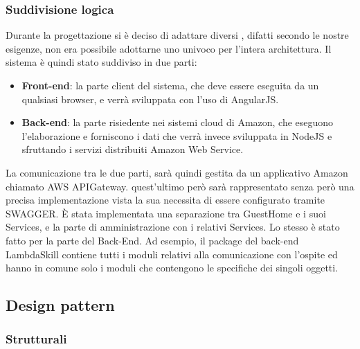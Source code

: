 \documentclass[../DefinizioneDiProdotto_v2.0.0.tex]{subfiles}
\begin{document}
\subsubsection{Suddivisione logica}
Durante la progettazione si è deciso di adattare diversi ,
difatti secondo le nostre esigenze, non era possibile adottarne uno univoco per l'intera architettura.
Il sistema è quindi stato suddiviso in due parti:
\begin{itemize}
	\item \textbf{Front-end}: la parte client del sistema, che deve essere eseguita da un qualsiasi browser, e verrà sviluppata con l'uso di AngularJS.
	\item \textbf{Back-end}: la parte risiedente nei sistemi cloud di Amazon, che eseguono l'elaborazione e forniscono i dati che verrà invece sviluppata in NodeJS e sfruttando i servizi distribuiti Amazon Web Service.
\end{itemize}
La comunicazione tra le due parti, sarà quindi gestita da un applicativo Amazon chiamato AWS APIGateway.
quest'ultimo però sarà rappresentato senza però una precisa implementazione vista la sua necessita di essere configurato tramite SWAGGER.
È stata implementata una separazione tra GuestHome e i suoi Services, e la parte di amministrazione con i relativi Services. Lo stesso è stato fatto per la parte del Back-End. Ad esempio, il package del back-end LambdaSkill contiene tutti i moduli relativi alla comunicazione con l'ospite ed hanno in comune solo i moduli che contengono le specifiche dei singoli oggetti.

\subsection{Design pattern}

\subsubsection{Strutturali}
\end{document}
